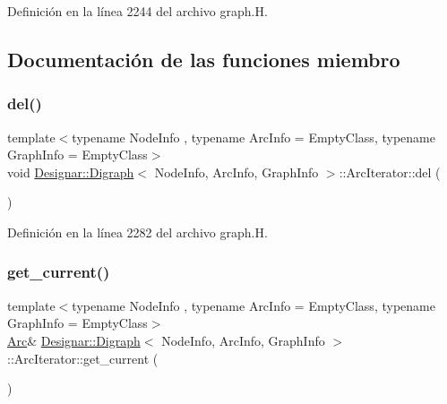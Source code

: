 Definición en la línea 2244 del archivo graph.\+H.



\subsection{Documentación de las funciones miembro}
\mbox{\label{class_designar_1_1_digraph_1_1_arc_iterator_aa4f42b888685025c5c3f2e730df4eb36}} 
\subsubsection{\texorpdfstring{del()}{del()}}
{\footnotesize\ttfamily template$<$typename Node\+Info , typename Arc\+Info  = Empty\+Class, typename Graph\+Info  = Empty\+Class$>$ \\
void \hyperlink{class_designar_1_1_digraph}{Designar\+::\+Digraph}$<$ Node\+Info, Arc\+Info, Graph\+Info $>$\+::Arc\+Iterator\+::del (\begin{DoxyParamCaption}{ }\end{DoxyParamCaption})\hspace{0.3cm}{\ttfamily [inline]}}



Definición en la línea 2282 del archivo graph.\+H.

\mbox{\label{class_designar_1_1_digraph_1_1_arc_iterator_af7734cd84a4dd523f276064833abaa85}} 
\subsubsection{\texorpdfstring{get\+\_\+current()}{get\_current()}\hspace{0.1cm}{\footnotesize\ttfamily [1/2]}}
{\footnotesize\ttfamily template$<$typename Node\+Info , typename Arc\+Info  = Empty\+Class, typename Graph\+Info  = Empty\+Class$>$ \\
\hyperlink{class_designar_1_1_digraph_a0ceb278671f2a535c00fddccdeafd69f}{Arc}\& \hyperlink{class_designar_1_1_digraph}{Designar\+::\+Digraph}$<$ Node\+Info, Arc\+Info, Graph\+Info $>$\+::Arc\+Iterator\+::get\+\_\+current (\begin{DoxyParamCaption}{ }\end{DoxyParamCaption})\hspace{0.3cm}{\ttfamily [inline]}}



